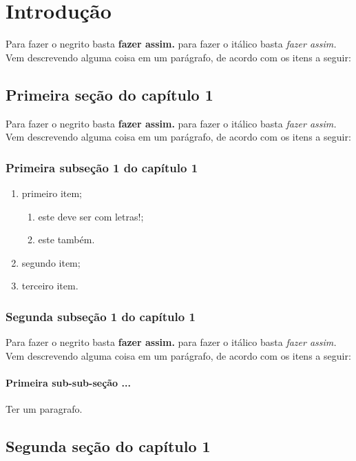 \chapter{Introdução}
Para fazer o negrito basta \textbf{fazer assim.} para fazer o itálico basta \textit{fazer assim.} Vem descrevendo alguma coisa em um parágrafo, de acordo com os itens a seguir:

\section{Primeira seção do capítulo 1}

Para fazer o negrito basta \textbf{fazer assim.} para fazer o itálico basta \textit{fazer assim.} Vem descrevendo alguma coisa em um parágrafo, de acordo com os itens a seguir:

\subsection{Primeira subseção 1 do capítulo 1}

\begin{enumerate}
    \item primeiro item;
    \begin{enumerate}
        \item este deve ser com letras!;
        \item este também.
    \end{enumerate}
    \item segundo item;
    \item terceiro item.
\end{enumerate}

\subsection{Segunda subseção 1 do capítulo 1}
Para fazer o negrito basta \textbf{fazer assim.} para fazer o itálico basta \textit{fazer assim.} Vem descrevendo alguma coisa em um parágrafo, de acordo com os itens a seguir:
\subsubsection{Primeira sub-sub-seção ...}
Ter um paragrafo.

\section{Segunda seção do capítulo 1}

